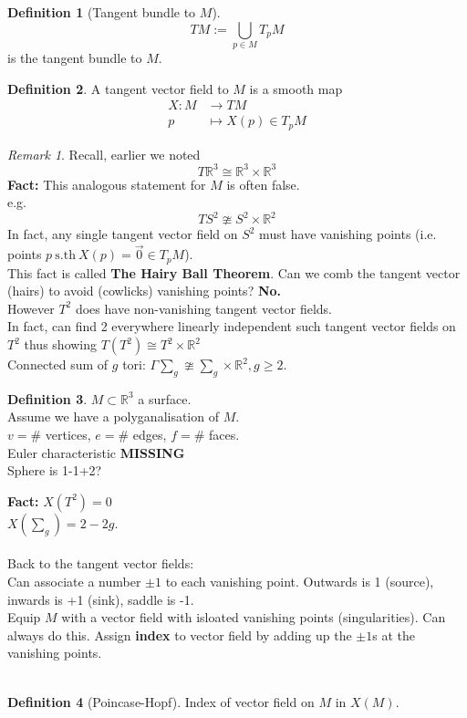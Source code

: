 \documentclass{article}
\newcommand{\sth}{\ \mathrm{s.th\ }}
\newcommand{\R}{\mathbb{R}}
\theoremstyle{definition}
\newtheorem{definition}{Definition}[section]
\theoremstyle{remark}
\theoremstyle{example}
\newtheorem*{remark}{Remark}
\begin{document}
	\begin{definition}[Tangent bundle to $M$]
		\[TM:=\bigcup_{p \in M}T_pM \] is the tangent bundle to $M$.
	\end{definition}

	\begin{definition}
		A tangent vector field to $M$ is a smooth map \begin{align*}
		X:M & \to TM\\
		p&\mapsto X(p) \in T_pM
	\end{align*}
	\end{definition}

	\begin{remark}
		Recall, earlier we noted \[T\R^3 \cong \R^3 \times \R^3 \]
		\textbf{Fact:} This analogous statement for $M$ is often false.\\
		e.g. \[TS^2 \ncong S^2 \times \R^2 \]
		In fact, any single tangent vector field on $S^2$ must have vanishing points (i.e. points $p \sth X(p)=\vec{0} \in T_pM$).\\
		This fact is called \textbf{The Hairy Ball Theorem}. Can we comb the tangent vector (hairs) to avoid (cowlicks) vanishing points? \textbf{No.}\\
		However $T^2$ does have non-vanishing tangent vector fields.\\
		In fact, can find 2 everywhere linearly independent such tangent vector fields on $T^2$ thus showing $T(T^2) \cong T^2 \times \R^2$\\
		Connected sum of $g$ tori: $\Gamma \sum_g \ncong \sum_g \times \R^2, g \geq 2$.
	\end{remark}
\pagebreak
	\begin{definition}
		$M \subset \R^3$ a surface.\\
		Assume we have a polyganalisation of $M$.\\
		$v=\#$ vertices, $e=\#$ edges, $f=\#$ faces.\\
		Euler characteristic \textbf{MISSING}\\
		Sphere is 1-1+2?
	\end{definition}
	\textbf{Fact:} $X(T^2)=0$\\
	$X(\sum_g)=2-2g$.\\
	\\
	Back to the tangent vector fields:\\
	Can associate a number $\pm 1$ to each vanishing point. Outwards is 1 (source), inwards is +1 (sink), saddle is -1.\\
	Equip $M$ with a vector field with isloated vanishing points (singularities). Can always do this. Assign \textbf{index} to vector field by adding up the $\pm 1$s at the vanishing points.\\
	\\
	\begin{definition}[Poincase-Hopf]
			Index of vector field on $M$ in $X(M)$.
	\end{definition}
	\pagebreak
\end{document}
